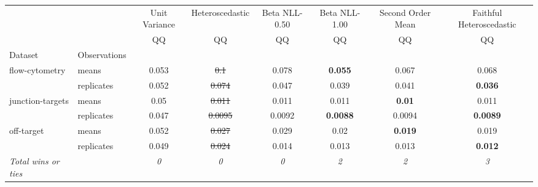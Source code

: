 \begin{tabular}{ll|c|c|c|c|c|c}
\toprule
{} & {} & {Unit Variance} & {Heteroscedastic} & {Beta NLL-0.50} & {Beta NLL-1.00} & {Second Order Mean} & {Faithful Heteroscedastic} \\
{} & {} & {QQ} & {QQ} & {QQ} & {QQ} & {QQ} & {QQ} \\
{Dataset} & {Observations} & {} & {} & {} & {} & {} & {} \\
\midrule
\multirow[t]{2}{*}{flow-cytometry} & means & 0.053 & \sout{0.1} & 0.078 & \textbf{0.055} & 0.067 & 0.068 \\
 & replicates & 0.052 & \sout{0.074} & 0.047 & 0.039 & 0.041 & \textbf{0.036} \\
\multirow[t]{2}{*}{junction-targets} & means & 0.05 & \sout{0.011} & 0.011 & 0.011 & \textbf{0.01} & 0.011 \\
 & replicates & 0.047 & \sout{0.0095} & 0.0092 & \textbf{0.0088} & 0.0094 & \textbf{0.0089} \\
\multirow[t]{2}{*}{off-target} & means & 0.052 & \sout{0.027} & 0.029 & 0.02 & \textbf{0.019} & 0.019 \\
 & replicates & 0.049 & \sout{0.024} & 0.014 & 0.013 & 0.013 & \textbf{0.012} \\
\textit{{Total wins or ties}} &  & \textit{0} & \textit{0} & \textit{0} & \textit{2} & \textit{2} & \textit{3} \\
\bottomrule
\end{tabular}
